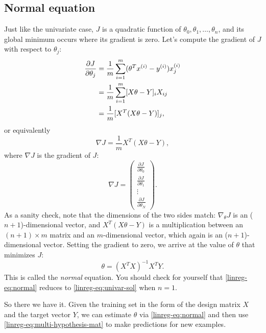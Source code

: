 \documentclass{article}
\theoremstyle{definition}
\begin{document}
\subsection{Normal equation}
\label{linreg-sec:normaleq}
Just like the univariate case, $J$ is a quadratic function of $\theta_0, \theta_1, \dots, \theta_n$, and its global minimum occurs where its gradient is zero. Let's compute the gradient of $J$ with respect to $\theta_j$:
\begin{align}
    \frac{\partial J}{\partial \theta_j} &= \frac{1}{m}\sum_{i=1}^{m}(\theta^Tx^{(i)} - y^{(i)})x^{(i)}_j\notag\\
    &=\frac{1}{m}\sum_{i=1}^{m}[X\theta - Y]_iX_{ij}\notag\\
    &=\frac{1}{m}[X^T(X\theta - Y)]_j,\label{linreg-eq:costfunc-mat}
\end{align}
or equivalently
\begin{equation}
    \nabla J = \frac{1}{m}X^T(X\theta - Y),
\end{equation}
where $\nabla J$ is the gradient of $J$:
\begin{equation}
    \nabla J =
    \begin{pmatrix}
        \frac{\partial J}{\partial \theta_0}\\
        \frac{\partial J}{\partial \theta_1}\\
        \vdots\\
        \frac{\partial J}{\partial \theta_N}
    \end{pmatrix}.
\end{equation}
As a sanity check, note that the dimensions of the two sides match: $\nabla_{\theta} J$ is an ($n+1$)-dimensional vector, and $X^T(X\theta - Y)$ is a multiplication between an $(n+1) \times m$ matrix and an $m$-dimensional vector, which again is an ($n+1$)-dimensional vector. Setting the gradient to zero, we arrive at the value of $\theta$ that minimizes $J$:
\begin{equation}
    \theta = \left(X^TX\right)^{-1}X^TY.
    \label{linreg-eq:normal}
\end{equation}
This is called the \textit{normal} equation. You should check for yourself that \eqref{linreg-eq:normal} reduces to \eqref{linreg-eq:univar-sol} when $n = 1$.

So there we have it. Given the training set in the form of the design matrix $X$ and the target vector $Y$, we can estimate $\theta$ via \eqref{linreg-eq:normal} and then use \eqref{linreg-eq:multi-hypothesis-mat} to make predictions for new examples.
\end{document}

